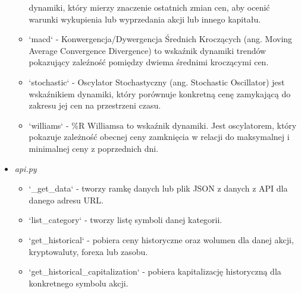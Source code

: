 \documentclass[12pt]{article}
\begin{document}
\begin{itemize}
\begin{itemize}
			dynamiki, który mierzy znaczenie ostatnich zmian cen, aby ocenić warunki wykupienia lub wyprzedania
			akcji lub innego kapitału.
			\item `macd` - Konwergencja/Dywergencja Średnich Kroczących (ang. Moving Average Convergence Divergence)
			to wskaźnik dynamiki trendów pokazujący zaleźność pomiędzy dwiema średnimi kroczącymi cen.
			\item `stochastic` - Oscylator Stochastyczny (ang. Stochastic Oscillator) jest wskaźnikiem dynamiki,
			który porównuje konkretną cenę zamykającą do zakresu jej cen na przestrzeni czasu.
			\item `williams` - \%R Williamsa to wskaźnik dynamiki. Jest oscylatorem, który pokazuje zależność obecnej
			ceny zamknięcia w relacji do maksymalnej i minimalnej ceny z poprzednich dni.
		\end{itemize}
		\item \textit{api.py}
			\begin{itemize}
				\item `\_get\_data` - tworzy ramkę danych lub plik JSON z danych z API dla danego adresu URL.
				\item `list\_category` - tworzy listę symboli danej kategorii.
				\item `get\_historical` - pobiera ceny historyczne oraz wolumen dla danej akcji, kryptowaluty, forexa
				lub zasobu.
				\item `get\_historical\_capitalization` - pobiera kapitalizację historyczną dla konkretnego symbolu
				akcji.
			\end{itemize}
	\end{itemize}
\end{document}
